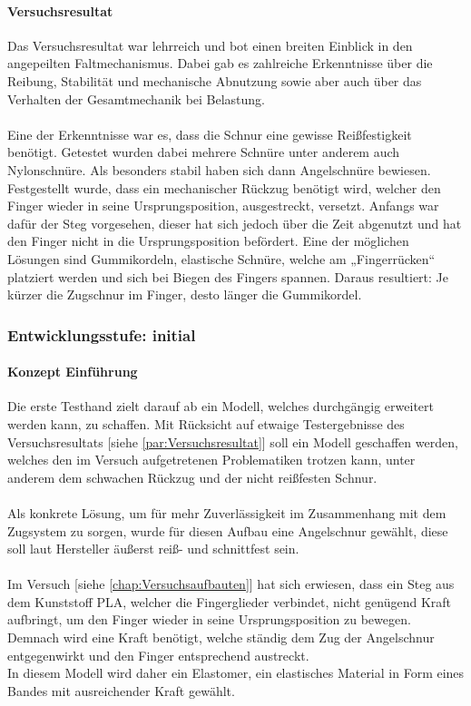 \documentclass[titlepage,12pt,twoside]{article}
\begin{document}
\paragraph{Versuchsresultat}
\label{par:Versuchsresultat}
\hfill \break
\hfill \break
Das Versuchsresultat war lehrreich und bot einen breiten Einblick in den angepeilten Faltmechanismus. 
Dabei gab es zahlreiche Erkenntnisse über die Reibung, Stabilität und mechanische Abnutzung
sowie aber auch über das Verhalten der Gesamtmechanik bei Belastung. \\
\\
Eine der Erkenntnisse war es, dass die Schnur eine gewisse Reißfestigkeit benötigt. 
Getestet wurden dabei mehrere Schnüre unter anderem auch Nylonschnüre. Als besonders 
stabil haben sich dann Angelschnüre bewiesen.
Festgestellt wurde, dass ein mechanischer Rückzug benötigt wird, welcher den 
Finger wieder in seine Ursprungsposition, ausgestreckt, versetzt. Anfangs war dafür 
der Steg vorgesehen, dieser hat sich jedoch über die Zeit abgenutzt und hat den 
Finger nicht in die Ursprungsposition befördert. Eine der möglichen Lösungen sind 
Gummikordeln, elastische Schnüre, welche am „Fingerrücken“ platziert werden und sich 
bei Biegen des Fingers spannen. Daraus resultiert: Je kürzer die Zugschnur im Finger, desto länger die 
Gummikordel. \\

\subsubsection{Entwicklungsstufe: initial}
\label{chap:Entwicklungsstufe: intitial}
\paragraph{Konzept Einführung}
\hfill \break
\hfill \break
Die erste Testhand zielt darauf ab ein Modell, welches durchgängig erweitert 
werden kann, zu schaffen. Mit Rücksicht auf etwaige Testergebnisse des 
Versuchsresultats [siehe \textcolor{blue}{\autoref{par:Versuchsresultat}}] soll ein Modell geschaffen werden, 
welches den im Versuch aufgetretenen Problematiken trotzen kann, unter anderem 
dem schwachen Rückzug und der nicht reißfesten Schnur. \\
\\
Als konkrete Lösung, um für mehr Zuverlässigkeit im Zusammenhang mit dem Zugsystem 
zu sorgen, wurde für diesen Aufbau eine Angelschnur gewählt, diese soll laut Hersteller äußerst reiß- und schnittfest sein. \\
\\
Im Versuch [siehe \textcolor{blue}{\autoref{chap:Versuchsaufbauten}}] hat sich erwiesen, dass ein Steg aus dem Kunststoff PLA, welcher die 
Fingerglieder verbindet, nicht genügend Kraft aufbringt, um den Finger wieder in 
seine Ursprungsposition zu bewegen. Demnach wird eine Kraft benötigt, welche 
ständig dem Zug der Angelschnur entgegenwirkt und den Finger entsprechend 
austreckt. \\
In diesem Modell wird daher ein Elastomer, ein elastisches Material in Form 
eines Bandes mit ausreichender Kraft gewählt. \\
\end{document}
